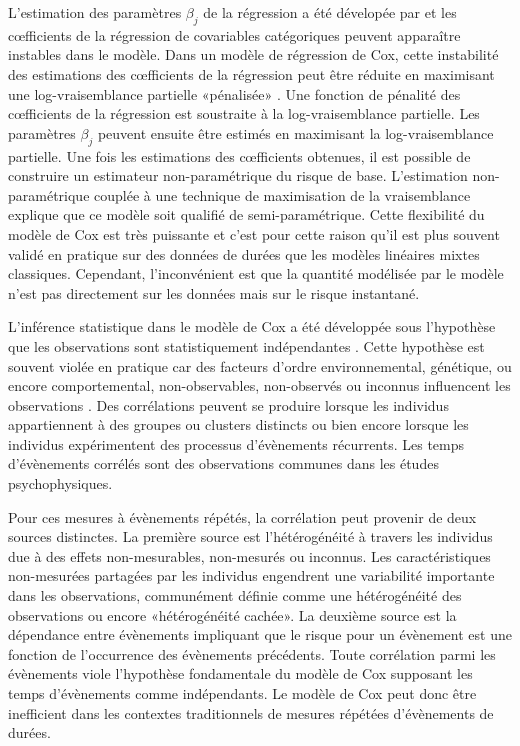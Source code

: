 L'estimation des paramètres $\beta_j$ de la régression a été dévelopée par \cite{andersen1993statistical} et les cœfficients de la régression de covariables catégoriques peuvent apparaître instables dans le modèle. 
Dans un modèle de régression de Cox, cette instabilité des estimations des cœfficients de la régression peut être réduite en maximisant une log-vraisemblance partielle «pénalisée» \citep{verweij1994penalized}. 
Une fonction de pénalité des cœfficients de la régression est soustraite à la log-vraisemblance partielle. 
Les paramètres $\beta_j$ peuvent ensuite être estimés en maximisant la log-vraisemblance partielle. 
Une fois les estimations des cœfficients obtenues, il est possible de construire un estimateur non-paramétrique du risque de base. 
L'estimation non-paramétrique couplée à une technique de maximisation de la vraisemblance explique que ce modèle soit qualifié de semi-paramétrique. 
Cette flexibilité du modèle de Cox est très puissante et c'est pour cette raison qu'il est plus souvent validé en pratique sur des données de durées que les modèles linéaires mixtes classiques. 
Cependant, l'inconvénient est que la quantité modélisée par le modèle n'est pas directement sur les données mais sur le risque instantané. 

L'inférence statistique dans le modèle de Cox a été développée sous l'hypothèse que les observations sont statistiquement indépendantes \citep{rondeau2003maximum}. 
Cette hypothèse est souvent violée en pratique car des facteurs d'ordre environnemental, génétique, ou encore comportemental, non-observables, non-observés ou inconnus influencent les observations \citep{box2006repeated}. 
Des corrélations peuvent se produire lorsque les individus appartiennent à des groupes ou clusters distincts ou bien encore lorsque les individus expérimentent des processus d'évènements récurrents. 
Les temps d'évènements corrélés sont des observations communes dans les études psychophysiques.

Pour ces mesures à évènements répétés, la corrélation peut provenir de deux sources distinctes. 
La première source est l'hétérogénéité à travers les individus due à des effets non-mesurables, non-mesurés ou inconnus. 
Les caractéristiques non-mesurées partagées par les individus engendrent une variabilité importante dans les observations, communément définie comme une hétérogénéité des observations ou encore «hétérogénéité cachée». 
La deuxième source est la dépendance entre évènements impliquant que le risque pour un évènement est une fonction de l'occurrence des évènements précédents. 
Toute corrélation parmi les évènements viole l'hypothèse fondamentale du modèle de Cox supposant les temps d'évènements comme indépendants. 
Le modèle de Cox peut donc être inefficient dans les contextes traditionnels de mesures répétées d'évènements de durées. 

